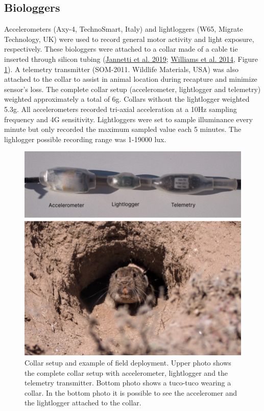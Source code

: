 \documentclass[english,msc,numbers,hidelinks]{coppe}
\begin{document}
  \hypertarget{biologgers}{%
  \subsection{Biologgers}\label{biologgers}}

  Accelerometers (Axy-4, TechnoSmart, Italy) and lightloggers (W65, Migrate Technology, UK) were used to record general motor activity and light exposure, respectively. These biologgers were attached to a collar made of a cable tie inserted through silicon tubing (\protect\hyperlink{ref-jannetti2019}{Jannetti et al. 2019}; \protect\hyperlink{ref-williams2014}{Williams et al. 2014}, Figure \ref{fig:methods-collar}). A telemetry transmitter (SOM-2011. Wildlife Materials, USA) was also attached to the collar to assist in animal location during recapture and minimize sensor's loss. The complete collar setup (accelerometer, lightlogger and telemetry) weighted approximately a total of 6g. Collars without the lightlogger weighted 5.3g. All accelerometers recorded tri-axial acceleration at a 10Hz sampling frequency and 4G sensitivity. Lightloggers were set to sample illuminance every minute but only recorded the maximum sampled value each 5 minutes. The lighlogger possible recording range was 1-19000 lux.
  \begin{figure}

  {\centering \includegraphics[width=1\linewidth]{../04_figures/collar/collar_tuco} 

  }

  \caption{Collar setup and example of field deployment. Upper photo shows the complete collar setup with accelerometer, lightlogger and the telemetry transmitter. Bottom photo shows a tuco-tuco wearing a collar. In the bottom photo it is possible to see the acceleromer and the lightlogger attached to the collar.}\label{fig:methods-collar}
  \end{figure}
\end{document}
